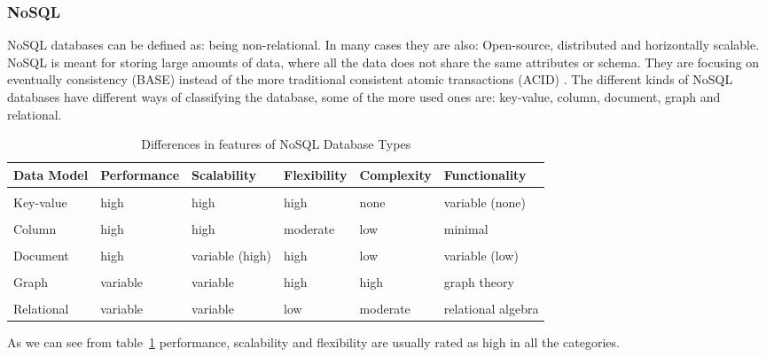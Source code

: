 \subsubsection*{NoSQL}
NoSQL databases can be defined as: being non-relational. In many cases they are also: Open-source, distributed and horizontally scalable\cite{nosql}. NoSQL is meant for storing large amounts of data\cite{bigdata}, where all the data does not share the same attributes or schema. They are focusing on eventually consistency (BASE) instead of the more traditional consistent atomic transactions (ACID) \cite{pritchett}. The different kinds of NoSQL databases have different ways of classifying the database, some of the more used ones are: key-value, column, document, graph and relational.

\begin{table}[H]
\centering
\begin{adjustwidth}{-2cm}{}
\begin{tabularx}{1.3\textwidth}{  l l l l l l }
  \textbf{Data Model} & \textbf{Performance} & \textbf{Scalability} & \textbf{Flexibility} & \textbf{Complexity} & \textbf{Functionality}\\
  \hline \\ [-1.5ex]
  Key-value & high      & high              & high      & none      & variable (none)\\
  \hline \\ [-1.5ex]
  Column    & high      & high              & moderate  & low       & minimal \\
  \hline \\ [-1.5ex]
  Document  & high      & variable (high)   & high      & low       & variable (low)\\
  \hline \\ [-1.5ex]
  Graph     & variable  & variable          & high      & high      & graph theory \\
  \hline \\ [-1.5ex]
  Relational & variable & variable          & low       & moderate  & relational algebra\\
\end{tabularx}
\end{adjustwidth}
\caption{Differences in features of NoSQL Database Types}
\label{table:nosql-calssifications}
\end{table}
As we can see from table~\ref{table:nosql-calssifications} performance, scalability and flexibility are usually rated as high in all the categories.

